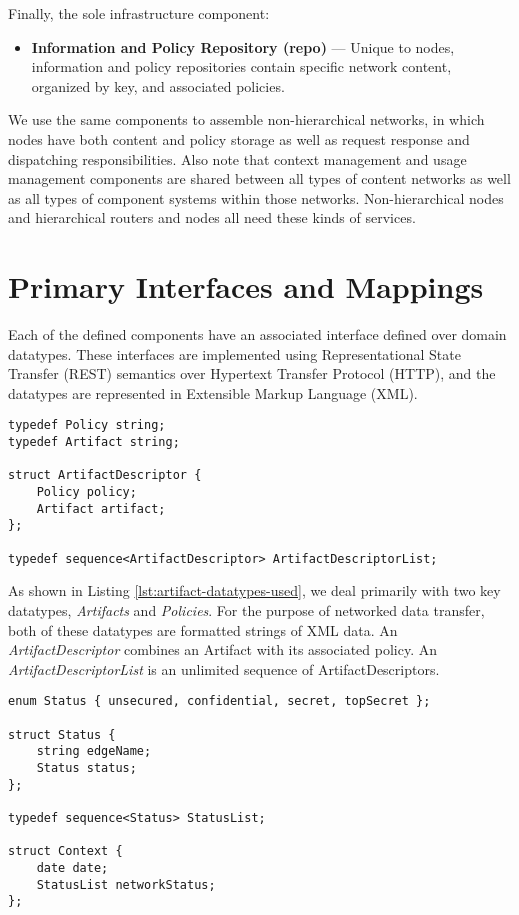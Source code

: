 Finally, the sole infrastructure component:

\begin{itemize}
\item \textbf{Information and Policy Repository (repo)} --- Unique to nodes, information and policy repositories contain specific network content, organized by key, and associated policies.
\end{itemize}

We use the same components to assemble non-hierarchical networks, in which nodes have both content and policy storage as well as request response and dispatching responsibilities.  Also note that context management and usage management components are shared between all types of content networks as well as all types of component systems within those networks.  Non-hierarchical nodes and hierarchical routers and nodes all need these kinds of services.

\section{Primary Interfaces and Mappings}
Each of the defined components have an associated interface defined over domain datatypes. These interfaces are implemented using Representational State Transfer (REST) semantics over Hypertext Transfer Protocol (HTTP), and the datatypes are represented in Extensible Markup Language (XML).

\begin{lstlisting}[label=lst:artifact-data-types, caption=Key Artifact Dataypes]
typedef Policy string;
typedef Artifact string;

struct ArtifactDescriptor {
	Policy policy;
	Artifact artifact;
};

typedef sequence<ArtifactDescriptor> ArtifactDescriptorList;
\end{lstlisting}

As shown in Listing \ref{lst:artifact-datatypes-used}, we deal primarily with two key datatypes, \emph{Artifacts} and \emph{Policies}.  For the purpose of networked data transfer, both of these datatypes are formatted strings of XML data.  An \emph{ArtifactDescriptor} combines an Artifact with its associated policy.  An \emph{ArtifactDescriptorList} is an unlimited sequence of ArtifactDescriptors.

\begin{lstlisting}[label=lst:status-data-types, caption=Key Status Dataypes]
enum Status { unsecured, confidential, secret, topSecret };

struct Status {
	string edgeName;
	Status status;
};

typedef sequence<Status> StatusList;

struct Context {
	date date;
	StatusList networkStatus;
};
\end{lstlisting}

